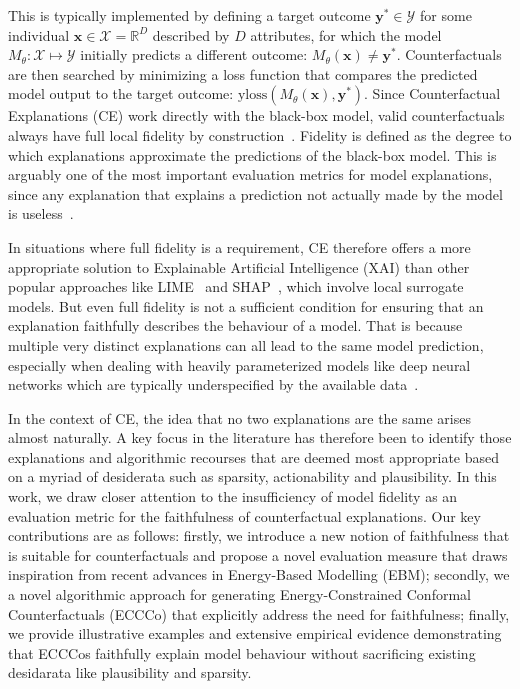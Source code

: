 \documentclass{article}
\begin{document}
This is typically implemented by defining a target outcome $\mathbf{y}^* \in \mathcal{Y}$ for some individual $\mathbf{x} \in \mathcal{X}=\mathbb{R}^D$ described by $D$ attributes, for which the model $M_{\theta}:\mathcal{X}\mapsto\mathcal{Y}$ initially predicts a different outcome: $M_{\theta}(\mathbf{x})\ne \mathbf{y}^*$. Counterfactuals are then searched by minimizing a loss function that compares the predicted model output to the target outcome: $\text{yloss}(M_{\theta}(\mathbf{x}),\mathbf{y}^*)$. Since Counterfactual Explanations (CE) work directly with the black-box model, valid counterfactuals always have full local fidelity by construction~\citep{mothilal2020explaining}. Fidelity is defined as the degree to which explanations approximate the predictions of the black-box model. This is arguably one of the most important evaluation metrics for model explanations, since any explanation that explains a prediction not actually made by the model is useless~\citep{molnar2020interpretable}. 

In situations where full fidelity is a requirement, CE therefore offers a more appropriate solution to Explainable Artificial Intelligence (XAI) than other popular approaches like LIME~\citep{ribeiro2016why} and SHAP~\citep{lundberg2017unified}, which involve local surrogate models. But even full fidelity is not a sufficient condition for ensuring that an explanation faithfully describes the behaviour of a model. That is because multiple very distinct explanations can all lead to the same model prediction, especially when dealing with heavily parameterized models like deep neural networks which are typically underspecified by the available data~\citep{wilson2020case}.

In the context of CE, the idea that no two explanations are the same arises almost naturally. A key focus in the literature has therefore been to identify those explanations and algorithmic recourses that are deemed most appropriate based on a myriad of desiderata such as sparsity, actionability and plausibility. In this work, we draw closer attention to the insufficiency of model fidelity as an evaluation metric for the faithfulness of counterfactual explanations. Our key contributions are as follows: firstly, we introduce a new notion of faithfulness that is suitable for counterfactuals and propose a novel evaluation measure that draws inspiration from recent advances in Energy-Based Modelling (EBM); secondly, we a novel algorithmic approach for generating Energy-Constrained Conformal Counterfactuals (ECCCo) that explicitly address the need for faithfulness; finally, we provide illustrative examples and extensive empirical evidence demonstrating that ECCCos faithfully explain model behaviour without sacrificing existing desidarata like plausibility and sparsity. 
\end{document}
